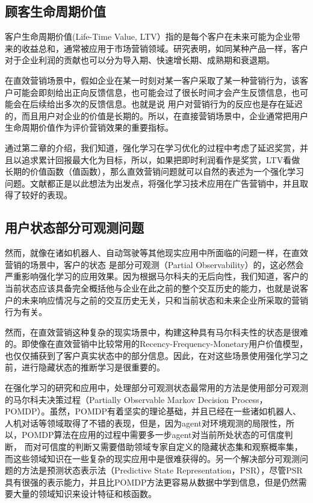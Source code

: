 \subsection{顾客生命周期价值}
客户生命周期价值(Life-Time Value, LTV）指的是每个客户在未来可能为企业带来的收益总和，通常被应用于市场营销领域。研究表明，如同某种产品一样，客户对于企业利润的贡献也可以分为导入期、快速增长期、成熟期和衰退期\citep{王广宇2013客户关系管理}。

在直效营销场景中，假如企业在某一时刻对某一客户采取了某一种营销行为，该客户可能会即刻给出正向反馈信息，也可能会过了很长时间才会产生反馈信息，也可能会在后续给出多次的反馈信息。也就是说
用户对营销行为的反应也是存在延迟的，而且用户对企业的价值是长期的。所以，在直接营销场景中，企业通常把用户生命周期价值作为评价营销效果的重要指标\citep{dwyer1997customer}。

通过第二章的介绍，我们知道，强化学习在学习优化的过程中考虑了延迟奖赏，并且以追求累计回报最大化为目标，所以，如果把即时利润看作是奖赏，LTV看做长期的价值函数（值函数），那么直效营销问题就可以自然的表述为一个强化学习问题。文献\citep{tkachenko2015autonomous,pednault2002sequential,silver2013concurrent}都正是以此想法为出发点，将强化学习技术应用在广告营销中，并且取得了较好的表现。

\subsection{用户状态部分可观测问题}
然而，就像在诸如机器人、自动驾驶等其他现实应用中所面临的问题一样，在直效营销的场景中，客户的状态
是部分可观测（Partial Observability）的，这必然会严重影响强化学习的应用效果。因为根据马尔科夫的无后向性，我们知道，客户的当前状态应该具备完全概括他与企业在此之前的整个交互历史的能力，也就是说客户的未来响应情况与之前的交互历史无关，只和当前状态和未来企业所采取的营销行为有关。

然而，在直效营销这种复杂的现实场景中，构建这种具有马尔科夫性的状态是很难的。即使像在直效营销中比较常用的Recency-Frequency-Monetary用户价值模型\citep{tkachenko2015autonomous}，也仅仅捕获到了客户真实状态中的部分信息。因此，在对这些场景使用强化学习之前，进行隐藏状态的推断学习是很重要的。

在强化学习的研究和应用中，处理部分可观测状态最常用的方法是使用部分可观测的马尔科夫决策过程（Partially Observable Markov  Decision Process，POMDP）\citep{kaelbling1998planning}。虽然，POMDP有着坚实的理论基础，并且已经在一些诸如机器人、人机对话等领域取得了不错的表现\citep{pineau2003point,williams2007partially}，但是，因为agent对环境观测的局限性，所以，POMDP算法在应用的过程中需要多一步agent对当前所处状态的可信度判断，
而对可信度的判断又需要借助领域专家自定义的隐藏状态集和观察概率集，而这些领域知识在一些复杂的现实应用中是很难获得的。另一个解决部分可观测问题的方法是预测状态表示法（Predictive State Representation，PSR）\citep{littman2002predictive}，尽管PSR具有很强的表示能力，并且比POMDP方法更容易从数据中学到信息，但是仍然需要大量的领域知识来设计特征和核函数。

